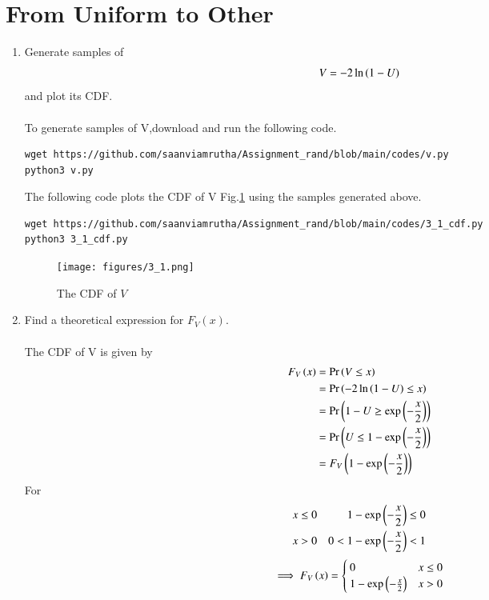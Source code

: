 \documentclass[journal,12pt,twocolumn]{IEEEtran}
\renewcommand\thesection{\arabic{section}}
\begin{document}
\section{From Uniform to Other}
\begin{enumerate}[label=\thesection.\arabic*
,ref=\thesection.\theenumi]
%
\item
Generate samples of 
%
\begin{equation}
V = -2\ln\left(1-U\right)
\end{equation}
%
and plot its CDF. \\
\solution \\
To generate samples of V,download and run the following code.
\begin{lstlisting}
wget https://github.com/saanviamrutha/Assignment_rand/blob/main/codes/v.py
python3 v.py
\end{lstlisting}
The following code plots the CDF of V Fig.\ref{fig:v_cdf} using the samples generated above.
\begin{lstlisting}
wget https://github.com/saanviamrutha/Assignment_rand/blob/main/codes/3_1_cdf.py
python3 3_1_cdf.py
\end{lstlisting}
\begin{figure}
\centering
\texttt{[image: figures/3\_1.png]}
\caption{The CDF of $V$}
\label{fig:v_cdf}
\end{figure}
\item Find a theoretical expression for $F_V(x)$.
%
\\ \solution \\
The CDF of V is given by
\begin{align}
    F_{V}\left(x\right)&=\Pr\left(V\leq x\right)\\
    &=\Pr\left(-2\ln{\ensuremath{\left(1-U\right)}}\leq x\right)\\
    &=\Pr\left(1-U\geq \exp\left(-\frac{x}{2}\right)\right)\\
    &=\Pr\left(U\leq 1-\exp\left(-\frac{x}{2}\right)\right)\\
    &=F_{V}\left(1-\exp\left(-\frac{x}{2}\right)\right)
\end{align}
For \begin{align}
&x\leq 0 & 1-\exp\left(-\frac{x}{2}\right)\leq 0 \\
&x>0  & 0<1-\exp\left(-\frac{x}{2}\right)<1
\end{align}
\begin{align}
    \implies F_{V}\left(x\right)=\begin{cases}
    0  &x\leq 0\\
    1-\exp\left(-\frac{x}{2}\right) & x>0
    \end{cases}
\end{align}
\end{enumerate}
\end{document}
